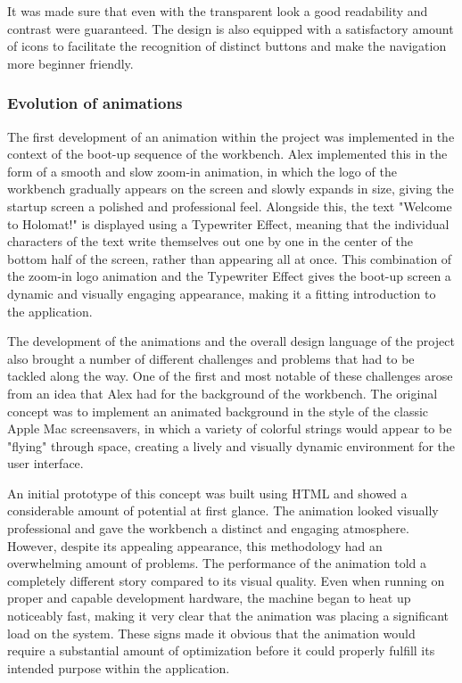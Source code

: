 \documentclass[a4paper,12pt]{article}
\begin{document}
It was made sure that even with the transparent look a good readability and contrast were guaranteed. 
The design is also equipped with a satisfactory amount of icons to facilitate the recognition of distinct buttons and make the navigation more beginner friendly.

\newpage
\subsubsection{Evolution of animations}
The first development of an animation within the project was implemented in the context of the boot-up sequence of the workbench. Alex implemented this in the form of a smooth and slow zoom-in animation, in which the logo of the workbench gradually appears on the screen and slowly expands in size, giving the startup screen a polished and professional feel. Alongside this, the text "Welcome to Holomat!" is displayed using a Typewriter Effect, meaning that the individual characters of the text write themselves out one by one in the center of the bottom half of the screen, rather than appearing all at once. This combination of the zoom-in logo animation and the Typewriter Effect gives the boot-up screen a dynamic and visually engaging appearance, making it a fitting introduction to the application.

The development of the animations and the overall design language of the project also brought a number of different challenges and problems that had to be tackled along the way. One of the first and most notable of these challenges arose from an idea that Alex had for the background of the workbench. The original concept was to implement an animated background in the style of the classic Apple Mac screensavers, in which a variety of colorful strings would appear to be "flying" through space, creating a lively and visually dynamic environment for the user interface.

An initial prototype of this concept was built using HTML and showed a considerable amount of potential at first glance. 
The animation looked visually professional and gave the workbench a distinct and engaging atmosphere. 
However, despite its appealing appearance, this methodology had an overwhelming amount of problems. 
The performance of the animation told a completely different story compared to its visual quality. 
Even when running on proper and capable development hardware, the machine began to heat up noticeably fast, making it very clear that the animation was placing a significant load on the system. These signs made it obvious that the animation would require a substantial amount of optimization before it could properly fulfill its intended purpose within the application.
\end{document}
